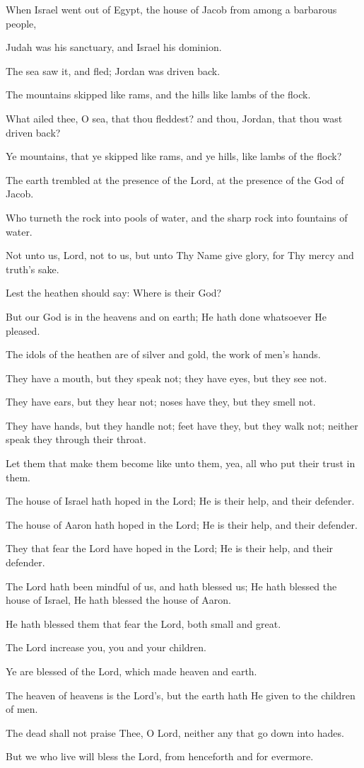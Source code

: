 When Israel went out of Egypt, the house of Jacob from among a barbarous people,

Judah was his sanctuary, and Israel his dominion.

The sea saw it, and fled; Jordan was driven back.

The mountains skipped like rams, and the hills like lambs of the flock.

What ailed thee, O sea, that thou fleddest? and thou, Jordan, that thou wast driven back?

Ye mountains, that ye skipped like rams, and ye hills, like lambs of the flock?

The earth trembled at the presence of the Lord, at the presence of the God of Jacob.

Who turneth the rock into pools of water, and the sharp rock into fountains of water.

Not unto us, Lord, not to us, but unto Thy Name give glory, for Thy mercy and truth’s sake.

Lest the heathen should say: Where is their God?

But our God is in the heavens and on earth; He hath done whatsoever He pleased.

The idols of the heathen are of silver and gold, the work of men’s hands.

They have a mouth, but they speak not; they have eyes, but they see not.

They have ears, but they hear not; noses have they, but they smell not.

They have hands, but they handle not; feet have they, but they walk not; neither speak they through their throat.

Let them that make them become like unto them, yea, all who put their trust in them.

The house of Israel hath hoped in the Lord; He is their help, and their defender.

The house of Aaron hath hoped in the Lord; He is their help, and their defender.

They that fear the Lord have hoped in the Lord; He is their help, and their defender.

The Lord hath been mindful of us, and hath blessed us; He hath blessed the house of Israel, He hath blessed the house of Aaron.

He hath blessed them that fear the Lord, both small and great.

The Lord increase you, you and your children.

Ye are blessed of the Lord, which made heaven and earth.

The heaven of heavens is the Lord's, but the earth hath He given to the children of men.

The dead shall not praise Thee, O Lord, neither any that go down into hades.

But we who live will bless the Lord, from henceforth and for evermore.
